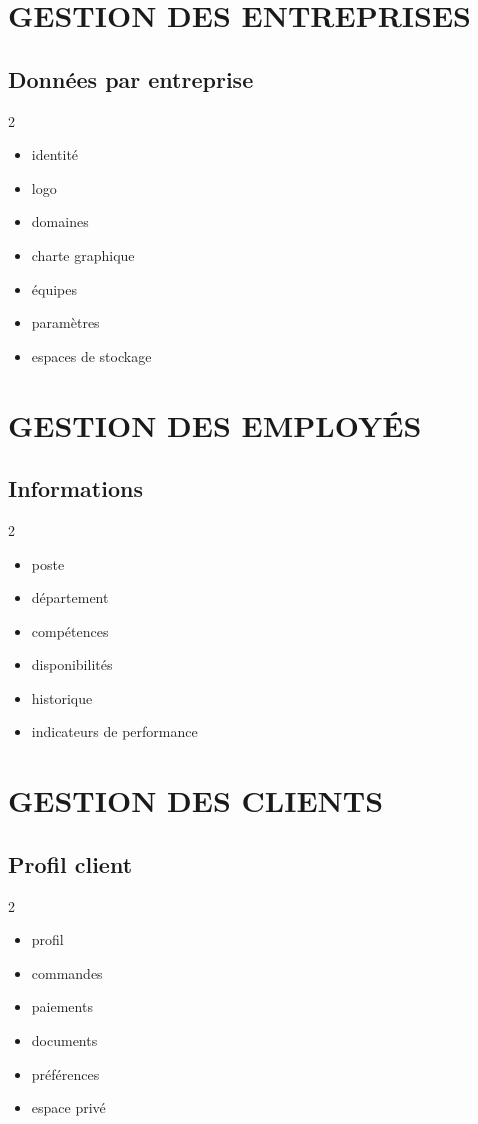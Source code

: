 \documentclass[12pt,a4paper,oneside]{book}
\begin{document}
\chapter{GESTION DES ENTREPRISES}

\section{Données par entreprise}
\begin{multicols}{2}
\begin{itemize}
\item identité
\item logo
\item domaines
\item charte graphique
\item équipes
\item paramètres
\item espaces de stockage
\end{itemize}
\end{multicols}

\chapter{GESTION DES EMPLOYÉS}

\section{Informations}
\begin{multicols}{2}
\begin{itemize}
\item poste
\item département
\item compétences
\item disponibilités
\item historique
\item indicateurs de performance
\end{itemize}
\end{multicols}

\chapter{GESTION DES CLIENTS}

\section{Profil client}
\begin{multicols}{2}
\begin{itemize}
\item profil
\item commandes
\item paiements
\item documents
\item préférences
\item espace privé
\end{itemize}
\end{multicols}
\end{document}
